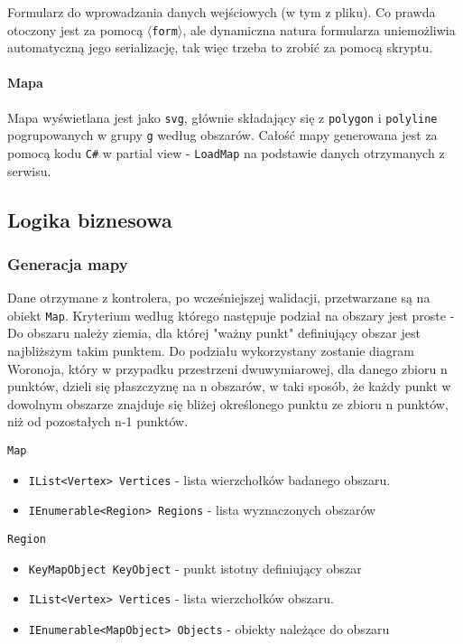 \documentclass[a4paper, 10pt, titlepage]{article}
\newcommand{\code}[1]{\texttt{#1}}
\begin{document}
Formularz do wprowadzania danych wejściowych (w tym z pliku).
Co prawda otoczony jest za pomocą \code{$\langle$form$\rangle$}, ale dynamiczna natura formularza uniemożliwia automatyczną jego serializację, tak więc trzeba to zrobić za pomocą skryptu. 

\paragraph{Mapa}

Mapa wyświetlana jest jako \code{svg}, głównie składający się z \code{polygon} i \code {polyline} pogrupowanych w grupy \code{g} według obszarów.
Całość mapy generowana jest za pomocą kodu \code{C\#} w partial view - \code{LoadMap} na podstawie danych otrzymanych z serwisu.

\subsection{Logika biznesowa}

\subsubsection{Generacja mapy}

Dane otrzymane z kontrolera, po wcześniejszej walidacji, przetwarzane są na obiekt \code{Map}. Kryterium według którego następuje podział na obszary jest proste - Do obszaru należy ziemia, dla której "ważny punkt" definiujący obszar jest najbliższym takim punktem. Do podziału wykorzystany zostanie diagram Woronoja, który w przypadku przestrzeni dwuwymiarowej, dla danego zbioru n punktów, dzieli się płaszczyznę na n obszarów, w taki sposób, że każdy punkt w dowolnym obszarze znajduje się bliżej określonego punktu ze zbioru n punktów, niż od pozostałych n-1 punktów.


\code{Map}

\begin{itemize}
\item \code{IList<Vertex> Vertices} - lista wierzchołków badanego obszaru.
\item \code{IEnumerable<Region> Regions} - lista wyznaczonych obszarów
\end{itemize}

\code{Region}
\begin{itemize}
\item \code{KeyMapObject KeyObject} - punkt istotny definiujący obszar
\item \code{IList<Vertex> Vertices} - lista wierzchołków obszaru.
\item \code{IEnumerable<MapObject> Objects} - obiekty należące do obszaru
\end{itemize}
\end{document}
